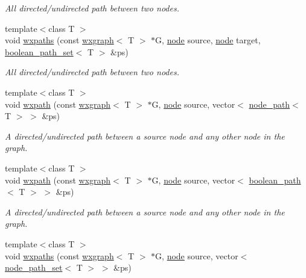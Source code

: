 \begin{DoxyCompactItemize}
\begin{DoxyCompactList}\small\item\em All directed/undirected path between two nodes. \end{DoxyCompactList}\item 
{\footnotesize template$<$class T $>$ }\\void \hyperlink{namespacelgraph_1_1traversal_af4f6d2630d596387b4ba4891c55a3773}{wxpaths} (const \hyperlink{classlgraph_1_1utils_1_1wxgraph}{wxgraph}$<$ T $>$ $\ast$G, \hyperlink{namespacelgraph_1_1utils_a7bd66ede3805ef121bc2835bd48de0cf}{node} source, \hyperlink{namespacelgraph_1_1utils_a7bd66ede3805ef121bc2835bd48de0cf}{node} target, \hyperlink{namespacelgraph_1_1utils_aaf50131e15d771a45620336d6e7a77f8}{boolean\+\_\+path\+\_\+set}$<$ T $>$ \&ps)
\begin{DoxyCompactList}\small\item\em All directed/undirected path between two nodes. \end{DoxyCompactList}\item 
{\footnotesize template$<$class T $>$ }\\void \hyperlink{namespacelgraph_1_1traversal_ac7a89afe8623b7e0d90fe4c5441d3e28}{wxpath} (const \hyperlink{classlgraph_1_1utils_1_1wxgraph}{wxgraph}$<$ T $>$ $\ast$G, \hyperlink{namespacelgraph_1_1utils_a7bd66ede3805ef121bc2835bd48de0cf}{node} source, vector$<$ \hyperlink{classlgraph_1_1utils_1_1node__path}{node\+\_\+path}$<$ T $>$ $>$ \&ps)
\begin{DoxyCompactList}\small\item\em A directed/undirected path between a source node and any other node in the graph. \end{DoxyCompactList}\item 
{\footnotesize template$<$class T $>$ }\\void \hyperlink{namespacelgraph_1_1traversal_af06a18e5ed57978bb1313deb1a32b8a1}{wxpath} (const \hyperlink{classlgraph_1_1utils_1_1wxgraph}{wxgraph}$<$ T $>$ $\ast$G, \hyperlink{namespacelgraph_1_1utils_a7bd66ede3805ef121bc2835bd48de0cf}{node} source, vector$<$ \hyperlink{classlgraph_1_1utils_1_1boolean__path}{boolean\+\_\+path}$<$ T $>$ $>$ \&ps)
\begin{DoxyCompactList}\small\item\em A directed/undirected path between a source node and any other node in the graph. \end{DoxyCompactList}\item 
{\footnotesize template$<$class T $>$ }\\void \hyperlink{namespacelgraph_1_1traversal_a55b574228440d721aa23669dc221e0f3}{wxpaths} (const \hyperlink{classlgraph_1_1utils_1_1wxgraph}{wxgraph}$<$ T $>$ $\ast$G, \hyperlink{namespacelgraph_1_1utils_a7bd66ede3805ef121bc2835bd48de0cf}{node} source, vector$<$ \hyperlink{namespacelgraph_1_1utils_a723c115f9865edfab11a90377b9abef4}{node\+\_\+path\+\_\+set}$<$ T $>$ $>$ \&ps)

\end{DoxyCompactItemize}
